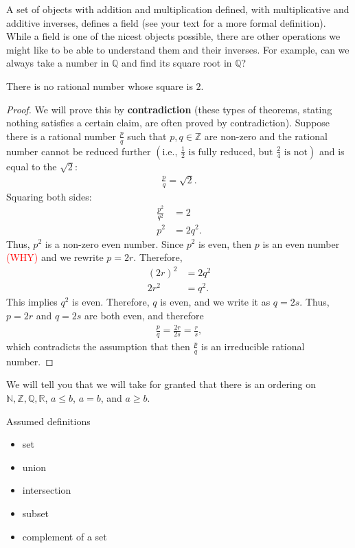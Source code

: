 \documentclass{ximera}
\begin{document}
A set of objects with addition and multiplication defined, with multiplicative and additive inverses, defines a field (see your text for a more formal definition).  While a field is one of the nicest objects possible, there are other operations we might like to be able to understand them and their inverses.  For example, can we always take a number in $\mathbb{Q}$ and find its square root in $\mathbb{Q}$?

\begin{theorem} 
There is no rational number whose square is $2$.
\end{theorem}
\begin{proof}
    We will prove this by \textbf{contradiction} (these types of theorems, stating nothing satisfies a certain claim, are often proved by contradiction).
    Suppose there is a rational number $\frac{p}q$ such that $p, q \in \mathbb{Z}$ are non-zero and the rational number cannot be reduced further $\left(\text{i.e., }\frac12 \text{ is fully reduced, but }\frac24 \text{ is not}\right)$ and is equal to the $\sqrt2$:
    \begin{align}
        \frac{p}q = \sqrt{2}.
    \end{align}
    Squaring both sides:
    \begin{align}
        \frac{p^2}{q^2} &= 2\\
        p^2 &= 2q^2.
    \end{align}
    Thus, $p^2$ is a non-zero even number.  Since $p^2$ is even, then $p$ is an even number \textcolor{red}{(WHY)} and we rewrite $p = 2r$.  Therefore,
    \begin{align}
        (2r)^2 &= 2q^2 \\
        2r^2 &= q^2.
    \end{align}
    This implies $q^2$ is even.  Therefore, $q$ is even, and we write it as $q = 2s$.  Thus, $p=2r$ and $q=2s$ are both even, and therefore
    \begin{align}
        \frac{p}{q} = \frac{2r}{2s} = \frac{r}{s},
    \end{align}
    which contradicts the assumption that then $\frac{p}{q}$ is an irreducible rational number.
\end{proof}

We will tell you that we will take for granted that there is an ordering on $\mathbb{N}, \mathbb{Z}, \mathbb{Q}, \mathbb{R}$, $a \leq b$, $a = b$, and $a \geq b$.

Assumed definitions
\begin{itemize}
    \item set
    \item union
    \item intersection
    \item subset
    \item complement of a set
\end{itemize}
\end{document}

